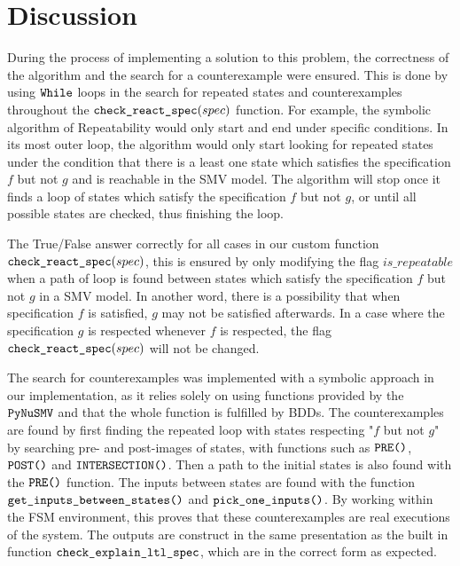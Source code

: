 \documentclass{article}
\begin{document}
\section{Discussion}

During the process of implementing a solution to this problem, the correctness of the algorithm and the search for a counterexample were ensured. This is done by using $\verb|While|$ loops in the search for repeated states and counterexamples throughout the $\verb|check_react_spec|(spec)$ function. For example, the symbolic algorithm of Repeatability would only start and end under specific conditions. In its most outer loop, the algorithm would only start looking for repeated states under the condition that there is a least one state which satisfies the specification $f$ but not $g$ and is reachable in the SMV model. The algorithm will stop once it finds a loop of states which satisfy the specification $f$ but not $g$, or until all possible states are checked, thus finishing the loop.

\medskip

The True/False answer correctly for all cases in our custom function $\verb|check_react_spec|(spec)$, this is ensured by only modifying the flag $is\_repeatable$ when a path of loop is found between states which satisfy the specification $f$ but not $g$ in a SMV model. In another word, there is a possibility that when specification $f$ is satisfied, $g$ may not be satisfied afterwards. In a case where the specification $g$ is respected whenever $f$ is respected, the flag $\verb|check_react_spec|(spec)$ will not be changed.

\medskip

The search for counterexamples was implemented with a symbolic approach in our implementation, as it relies solely on using functions provided by the $\verb|PyNuSMV|$ and that the whole function is fulfilled by BDDs. The counterexamples are found by first finding the repeated loop with states respecting "$f$ but not $g$" by searching pre- and post-images of states, with functions such as $\verb|PRE()|$, $\verb|POST()|$ and $\verb|INTERSECTION()|$. Then a path to the initial states is also found with the $\verb|PRE()|$ function. The inputs between states are found with the function $\verb|get_inputs_between_states()|$ and $\verb|pick_one_inputs()|$. By working within the FSM environment, this proves that these counterexamples are real executions of the system. The outputs are construct in the same presentation as the built in function $\verb|check_explain_ltl_spec|$, which are in the correct form as expected.
\end{document}
